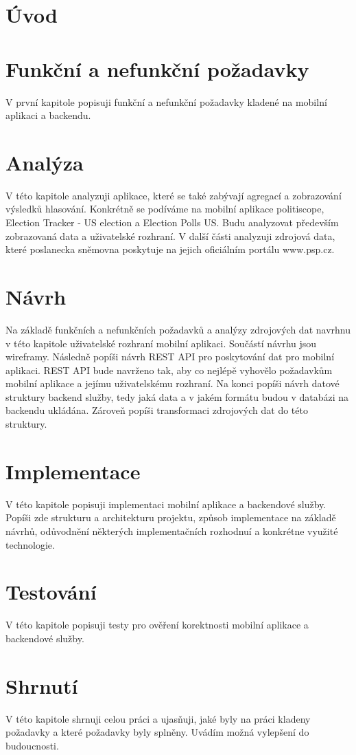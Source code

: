 \documentclass[czech,bachelor,unicode]{ctufit-thesis}
\theoremstyle{plain}
\theoremstyle{definition}
\theoremstyle{remark}
\numberwithin{theorem}{chapter}
\begin{document}
\begin{summarypage}
\section*{Úvod}

\section*{Funkční a nefunkční požadavky}
V první kapitole popisuji funkční a nefunkční požadavky kladené na mobilní aplikaci a backendu.

\section*{Analýza}
V této kapitole analyzuji aplikace, které se také zabývají agregací a zobrazování výsledků hlasování. Konkrétně se podíváme na mobilní aplikace politiscope, Election Tracker - US election a Election Polls US. Budu analyzovat především zobrazovaná data a uživatelské rozhraní. V další části analyzuji zdrojová data, které poslanecka sněmovna poskytuje na jejich oficiálním portálu www.psp.cz.

\section*{Návrh}
Na základě funkčních a nefunkčních požadavků a analýzy zdrojových dat navrhnu v této kapitole uživatelské rozhraní mobilní aplikaci. Součástí návrhu jsou wireframy. Následně popíši návrh REST API pro poskytování dat pro mobilní aplikaci. REST API bude navrženo tak, aby co nejlépě vyhovělo požadavkům mobilní aplikace a jejímu uživatelskému rozhraní. Na konci popíši návrh datové struktury backend služby, tedy jaká data a v jakém formátu budou v databázi na backendu ukládána. Zároveň popíši transformaci zdrojových dat do této struktury.

\section*{Implementace}
V této kapitole popisuji implementaci mobilní aplikace a backendové služby. Popíši zde strukturu a architekturu projektu, způsob implementace na základě návrhů, odůvodnění některých implementačních rozhodnuí a konkrétne využité technologie.

\section*{Testování}
V této kapitole popisuji testy pro ověření korektnosti mobilní aplikace a backendové služby.


\section*{Shrnutí}
V této kapitole shrnuji celou práci a ujasňuji, jaké byly na práci kladeny požadavky a které požadavky byly splněny. Uvádím možná vylepšení do budoucnosti.

\end{summarypage}
\end{document}

